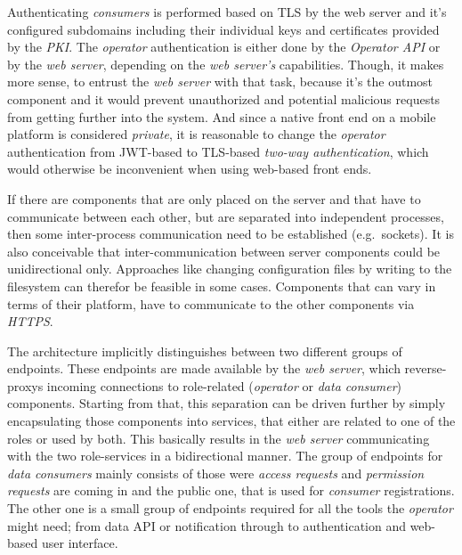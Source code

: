 \documentclass[12pt,english,a4paper,titlepage,cleardoublepage=empty,dottedtoc]{report}
\begin{document}
Authenticating \emph{consumers} is performed based on TLS by the web
server and it's configured subdomains including their individual keys
and certificates provided by the \emph{PKI}. The \emph{operator}
authentication is either done by the \emph{Operator API} or by the
\emph{web server}, depending on the \emph{web server's} capabilities.
Though, it makes more sense, to entrust the \emph{web server} with that
task, because it's the outmost component and it would prevent
unauthorized and potential malicious requests from getting further into
the system. And since a native front end on a mobile platform is
considered \emph{private}, it is reasonable to change the
\emph{operator} authentication from JWT-based to TLS-based \emph{two-way
authentication}, which would otherwise be inconvenient when using
web-based front ends.

If there are components that are only placed on the server and that have
to communicate between each other, but are separated into independent
processes, then some inter-process communication need to be established
(e.g.~sockets). It is also conceivable that inter-communication between
server components could be unidirectional only. Approaches like changing
configuration files by writing to the filesystem can therefor be
feasible in some cases. Components that can vary in terms of their
platform, have to communicate to the other components via \emph{HTTPS}.

The architecture implicitly distinguishes between two different groups
of endpoints. These endpoints are made available by the \emph{web
server}, which reverse-proxys incoming connections to role-related
(\emph{operator} or \emph{data consumer}) components. Starting from
that, this separation can be driven further by simply encapsulating
those components into services, that either are related to one of the
roles or used by both. This basically results in the \emph{web server}
communicating with the two role-services in a bidirectional manner. The
group of endpoints for \emph{data consumers} mainly consists of those
were \emph{access requests} and \emph{permission requests} are coming in
and the public one, that is used for \emph{consumer} registrations. The
other one is a small group of endpoints required for all the tools the
\emph{operator} might need; from data API or notification through to
authentication and web-based user interface.
\end{document}
